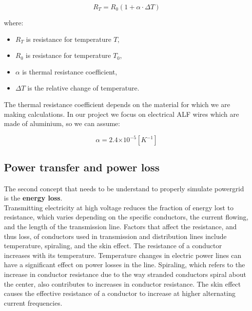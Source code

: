 \documentclass[a4paper]{article}
\providecommand{\e}[1]{\ensuremath{\times 10^{#1}}}
\begin{document}
\begin{equation}
R_T=R_0(1+\alpha \cdot \Delta T)
\end{equation}

where:
\begin{itemize}
	\setlength{\itemsep}{1pt}
	\setlength{\parskip}{0pt}
	\setlength{\parsep}{0pt}
\item $R_T$ is resistance for temperature $T$,
\item $R_0$ is resistance for temperature $T_0$,
\item $\alpha$ is thermal resistance coefficient,
\item $\Delta T$ is the relative change of temperature.\\
\end{itemize}

The thermal resistance coefficient depends on the material for which we are making calculations. In our project we focus on electrical ALF wires which are made of aluminium, so we can assume:

\begin{equation}
\alpha = 2.4\e{-5} [K^{-1}]
\end{equation}

\subsection{Power transfer and power loss}
\label{sec:powerTransferAndPowerLoss}
\paragraph{}

The second concept that needs to be understand to properly simulate powergrid is the \textbf{energy loss}.\\ 

Transmitting electricity at high voltage reduces the fraction of energy lost to resistance, which varies depending on the specific conductors, the current flowing, and the length of the transmission line. Factors that affect the resistance, and thus loss, of conductors used in transmission and distribution lines include temperature, spiraling, and the skin effect. The resistance of a conductor increases with its temperature. Temperature changes in electric power lines can have a significant effect on power losses in the line. Spiraling, which refers to the increase in conductor resistance due to the way stranded conductors spiral about the center, also contributes to increases in conductor resistance. The skin effect causes the effective resistance of a conductor to increase at higher alternating current frequencies. \cite{Art8}\\
\end{document}
